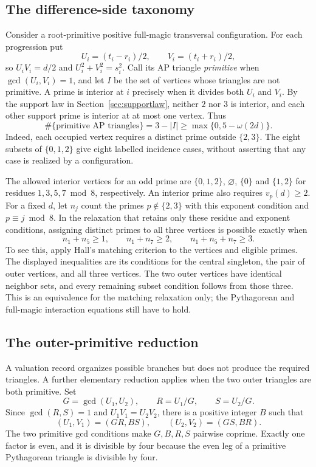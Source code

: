 \subsection{The difference-side taxonomy}

Consider a root-primitive positive full-magic transversal configuration.
For each progression put
\[
U_i=(t_i-r_i)/2,\qquad V_i=(t_i+r_i)/2,
\]
so $U_iV_i=d/2$ and $U_i^2+V_i^2=s_i^2$. Call its AP triangle
\emph{primitive} when $\gcd(U_i,V_i)=1$, and let $I$ be the set of vertices
whose triangles are not primitive. A prime is interior at $i$ precisely
when it divides both $U_i$ and $V_i$. By the support law in
Section~\ref{sec:supportlaw}, neither $2$ nor $3$ is interior, and each
other support prime is interior at at most one vertex. Thus
\[
\#\{\text{primitive AP triangles}\}
 =3-|I|\ge\max\{0,5-\omega(2d)\}.
\]
Indeed, each occupied vertex requires a distinct prime outside $\{2,3\}$.
The eight subsets of $\{0,1,2\}$ give eight labelled incidence cases,
without asserting that any case is realized by a configuration.

The allowed interior vertices for an odd prime are $\{0,1,2\}$,
$\varnothing$, $\{0\}$ and $\{1,2\}$ for residues $1,3,5,7\bmod8$,
respectively. An interior prime also requires $v_p(d)\ge2$. For a fixed
$d$, let $n_j$ count the primes $p\notin\{2,3\}$ with this exponent
condition and $p\equiv j\bmod8$. In the relaxation that retains only
these residue and exponent conditions, assigning distinct primes to all
three vertices is possible exactly when
\[
n_1+n_5\ge1,\qquad n_1+n_7\ge2,\qquad n_1+n_5+n_7\ge3.
\]
To see this, apply Hall's matching criterion to the vertices and eligible
primes. The displayed inequalities are its conditions for the central
singleton, the pair of outer vertices, and all three vertices. The two
outer vertices have identical neighbor sets, and every remaining subset
condition follows from those three. This is an equivalence for the
matching relaxation only; the Pythagorean and full-magic interaction
equations still have to hold.

\subsection{The outer-primitive reduction}

A valuation record organizes possible branches but does not produce the
required triangles. A further elementary reduction applies when the two
outer triangles are both primitive. Set
\[
G=\gcd(U_1,U_2),\qquad R=U_1/G,\qquad S=U_2/G.
\]
Since $\gcd(R,S)=1$ and $U_1V_1=U_2V_2$, there is a positive integer $B$
such that
\[
(U_1,V_1)=(GR,BS),\qquad (U_2,V_2)=(GS,BR).
\]
The two primitive gcd conditions make $G,B,R,S$ pairwise coprime.
Exactly one factor is even, and it is divisible by four because the even
leg of a primitive Pythagorean triangle is divisible by four.

